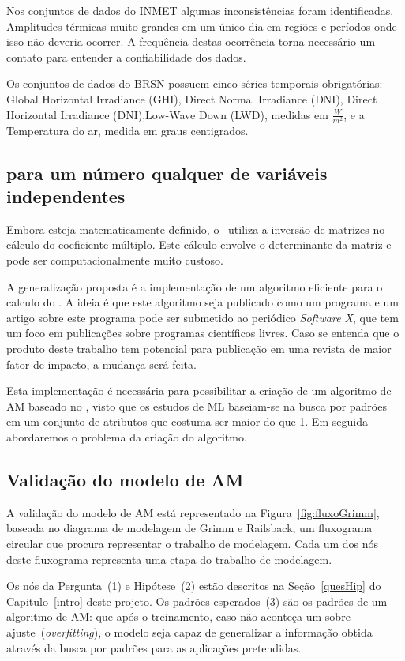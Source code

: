 Nos conjuntos de dados do INMET algumas inconsistências foram identificadas. Amplitudes térmicas muito grandes em um único dia em regiões e períodos onde isso não deveria ocorrer. A frequência destas ocorrência torna necessário um contato para entender a confiabilidade dos dados.

Os conjuntos de dados do BRSN possuem cinco séries temporais obrigatórias: Global Horizontal Irradiance (GHI), Direct Normal Irradiance (DNI), Direct Horizontal Irradiance (DNI),Low-Wave Down (LWD), medidas em $\frac{W}{m^2}$, e a Temperatura do ar, medida em graus centigrados.  

\subsection{\dmc para um número qualquer de variáveis independentes}

Embora esteja matematicamente definido, o \dmc~utiliza a inversão de matrizes no cálculo do coeficiente múltiplo. Este cálculo envolve o determinante da matriz e pode ser computacionalmente muito custoso.

A generalização proposta é a implementação de um algoritmo eficiente para o calculo do \dmc. A ideia é que este algoritmo seja publicado como um programa e um artigo sobre este programa pode ser submetido ao periódico \emph{Software X}, que tem um foco em publicações sobre programas científicos livres. Caso se entenda que o produto deste trabalho tem potencial para publicação em uma revista de maior fator de impacto, a mudança será feita.

Esta implementação é necessária para possibilitar a criação de um algoritmo de AM baseado no \dmc, visto que os estudos de ML baseiam-se na busca por padrões em um conjunto de atributos que costuma ser maior do que 1. Em seguida abordaremos o problema da criação do algoritmo. 

\subsection{Validação do modelo de AM}
\label{ssec:vlalid}
A validação do modelo de AM está representado na Figura~\ref{fig:fluxoGrimm}, baseada no diagrama de modelagem de Grimm e Railsback, um fluxograma circular que procura representar o trabalho de modelagem. Cada um dos nós deste fluxograma representa uma etapa do trabalho de modelagem.

Os nós da Pergunta~(1) e Hipótese~(2) estão descritos na Seção~\ref{quesHip} do Capitulo~\ref{intro} deste projeto. Os padrões esperados~(3) são os padrões de um algoritmo de AM: que após o treinamento, caso não aconteça um sobre-ajuste~(\emph{overfitting}), o modelo seja capaz de generalizar a informação obtida através da busca por padrões para as aplicações pretendidas.

